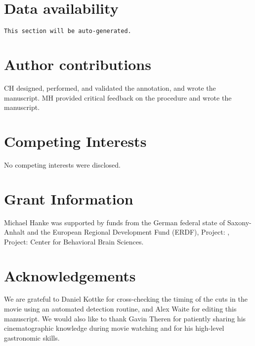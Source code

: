 \documentclass[10pt,a4paper]{article}
\begin{document}
\begin{multicols}{2}
\section*{Data availability}

\texttt{This section will be auto-generated.}


\section*{Author contributions}
CH designed, performed, and validated the annotation, and wrote the manuscript.
MH provided critical feedback on the procedure and wrote the manuscript.

\section*{Competing Interests}
No competing interests were disclosed.

\section*{Grant Information}

Michael Hanke was supported by funds from the German federal state of
Saxony-Anhalt and the European Regional Development Fund (ERDF), Project: ,
Project: Center for Behavioral Brain Sciences.

\section*{Acknowledgements}
We are grateful to Daniel Kottke for cross-checking the timing of the cuts in
the movie using an automated detection routine, and Alex Waite for editing this
manuscript. We would also like to thank Gavin Theren for patiently sharing his
cinematographic knowledge during movie watching and for his high-level
gastronomic skills.

{\small
}

\end{multicols}
\end{document}
